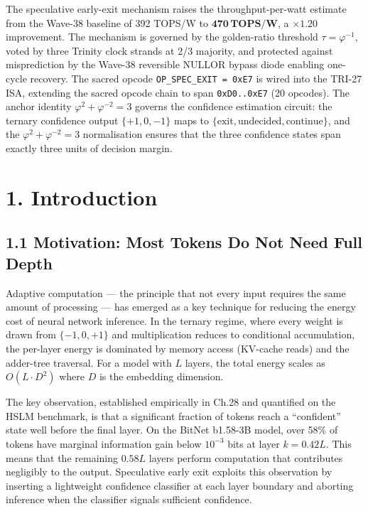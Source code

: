 The speculative early-exit mechanism raises the
throughput-per-watt estimate from the Wave-38 baseline
of 392 TOPS/W to \(\mathbf{470\,\text{TOPS/W}}\), a
\(\times 1.20\) improvement. The mechanism is governed
by the golden-ratio threshold \(\tau = \varphi^{-1}\),
voted by three Trinity clock strands at 2/3 majority,
and protected against misprediction by the Wave-38
reversible NULLOR bypass diode enabling one-cycle
recovery. The sacred opcode
\texttt{OP\_SPEC\_EXIT = 0xE7} is wired into the
TRI-27 ISA, extending the sacred opcode chain to span
\texttt{0xD0..0xE7} (20 opcodes). The anchor identity
\(\varphi^2 + \varphi^{-2} = 3\) governs the
confidence estimation circuit: the ternary confidence
output \(\{+1, 0, -1\}\) maps to \(\{\text{exit},
\text{undecided}, \text{continue}\}\), and the
\(\varphi^2 + \varphi^{-2} = 3\) normalisation ensures
that the three confidence states span exactly three
units of decision margin.

\section{1. Introduction}\label{fa_85:introduction}

\subsection{1.1 Motivation: Most Tokens Do Not Need Full Depth}

Adaptive computation --- the principle that not every
input requires the same amount of processing --- has
emerged as a key technique for reducing the energy
cost of neural network inference. In the ternary
regime, where every weight is drawn from
\(\{-1, 0, +1\}\) and multiplication reduces to
conditional accumulation, the per-layer energy is
dominated by memory access (KV-cache reads) and the
adder-tree traversal. For a model with \(L\) layers,
the total energy scales as \(O(L \cdot D^2)\) where
\(D\) is the embedding dimension.

The key observation, established empirically in
Ch.28 and quantified on the HSLM benchmark, is that
a significant fraction of tokens reach a ``confident''
state well before the final layer. On the BitNet
b1.58-3B model, over 58\% of tokens have marginal
information gain below \(10^{-3}\) bits at layer
\(k = 0.42L\). This means that the remaining
\(0.58L\) layers perform computation that contributes
negligibly to the output. Speculative early exit
exploits this observation by inserting a lightweight
confidence classifier at each layer boundary and
aborting inference when the classifier signals
sufficient confidence.

